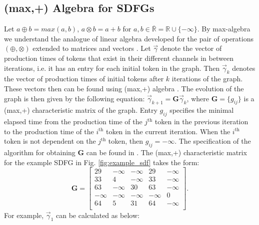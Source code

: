 \documentclass[]{eptcs}
\begin{document}
\subsection{(max,+) Algebra for SDFGs}
Let $a \oplus b = \mathit{max}(a, b)$, $a \otimes b = a + b$ for $a, b \in \overline{\mathbb{R}} = \mathbb{R} \cup \{-\infty\}$. By max-algebra we
understand the analogue of linear algebra developed for the pair of operations $(\oplus,\otimes)$ extended
to matrices and vectors \cite{2bacc:all}.
Let $\vec{\gamma}$ denote the vector of production times of tokens that exist in their different channels in between iterations, i.e. it has an entry for each initial token in the graph. Then  $\vec{\gamma}_k$ denotes the vector of production times of initial tokens after $k$ iterations of the graph. These vectors then can be found using (max,+) algebra \cite{2bacc:all}. The evolution of the graph is then given by the following equation: $\vec{\gamma}_{k+1}=\mathbf{G} \vec{\gamma}_k$, where $\mathbf{G}=\{g_{ij}\}$ is a (max,+) characteristic matrix of the graph. Entry $g_{ij}$ specifies the minimal elapsed time from the production time of the $j^{\mathrm{th}}$ token in the previous iteration to the production time of the $i^{\mathrm{th}}$ token in the current iteration. When the $i^{\mathrm{th}}$ token is not dependent on the $j^{\mathrm{th}}$ token, then $g_{ij}=-\infty$. The specification of the algorithm for obtaining $\mathbf{G}$ can be found in \cite{2geil}. The (max,+) characteristic matrix for the example SDFG in Fig. \ref{fig:example_sdf} takes the form:
\[ \mathbf{G} = \begin{bmatrix}
29 & -\infty & -\infty & 29 & -\infty \\
33 & 4 & -\infty & 33 & -\infty\\
63 & -\infty & 30 & 63 & -\infty\\
-\infty & -\infty & -\infty & -\infty & 0\\
64 & 5 & 31 & 64 & -\infty\\
\end{bmatrix}.\]
For example, $\vec{\gamma}_1$ can be calculated as below:
\end{document}
